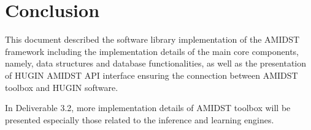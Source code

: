 \section{Conclusion}\label{sec:Conclusion}

This document described the software library implementation of the AMIDST framework including the implementation details of the main core components, namely, data structures and database functionalities, as well as the presentation of HUGIN AMIDST API interface ensuring the connection between AMIDST toolbox and HUGIN software.

In Deliverable 3.2, more implementation details of AMIDST toolbox will be presented especially those related to the inference and learning engines.